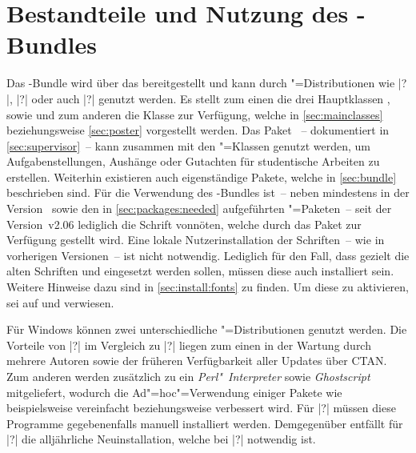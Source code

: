 \section{Bestandteile und Nutzung des \TUDScript-Bundles}
%
%
Das \TUDScript-Bundle wird über das \CTAN bereitgestellt und kann durch 
"=Distributionen wie |?|, 
|?| oder auch |?| 
genutzt werden. Es stellt zum einen die drei Hauptklassen , 
 sowie  und zum anderen die Klasse 
 zur Verfügung, welche in \autoref{sec:mainclasses} 
beziehungsweise \autoref{sec:poster} vorgestellt werden. Das Paket 
~-- dokumentiert in \autoref{sec:supervisor}~-- kann 
zusammen mit den \TUDScript"=Klassen genutzt werden, um Aufgabenstellungen, 
Aushänge oder Gutachten für studentische Arbeiten zu erstellen. Weiterhin 
existieren auch eigenständige Pakete, welche in \autoref{sec:bundle} 
beschrieben sind. Für die Verwendung des \TUDScript-Bundles ist~-- neben 
\KOMAScript{} mindestens in der Version~\vKOMAScript{} sowie den in 
\autoref{sec:packages:needed} aufgeführten "=Paketen~-- seit der 
Version~v2.06 lediglich die Schrift \OpenSans vonnöten, welche durch das Paket 
 zur Verfügung gestellt wird. Eine lokale Nutzerinstallation 
der Schriften~-- wie in vorherigen Versionen~-- ist nicht notwendig. Lediglich 
für den Fall, dass gezielt die alten Schriften \Univers und \DIN eingesetzt 
werden sollen, müssen diese auch installiert sein. Weitere Hinweise dazu sind 
in \autoref{sec:install:fonts} zu finden.  Um diese zu aktivieren, sei auf 
 und  verwiesen.

Für Windows können zwei unterschiedliche "=Distributionen genutzt 
werden. Die Vorteile von |?| im Vergleich zu 
|?| liegen zum einen in der Wartung durch mehrere 
Autoren sowie der früheren Verfügbarkeit aller Updates über CTAN. Zum anderen 
werden zusätzlich zu  ein \emph{Perl"~Interpreter} sowie 
\emph{Ghostscript} mitgeliefert, wodurch die Ad"=hoc"=Verwendung einiger 
Pakete wie beispielsweise  vereinfacht beziehungsweise 
verbessert wird. Für |?| müssen diese Programme 
gegebenenfalls manuell installiert werden. Demgegenüber entfällt für 
|?| die alljährliche Neuinstallation, welche bei 
|?| notwendig ist.

